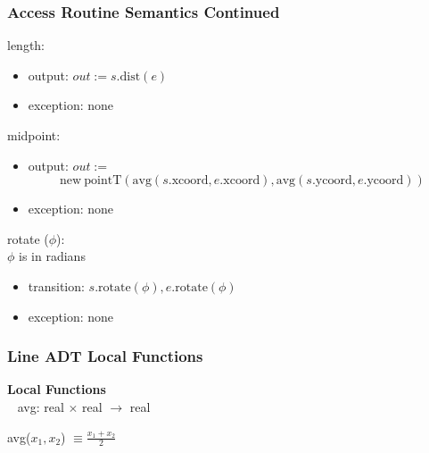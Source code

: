 \documentclass[t,12pt,numbers,fleqn,handout]{beamer}
\begin{document}

\begin{frame}
\frametitle{Access Routine Semantics Continued}

\noindent length:
\begin{itemize}
\item output: $out := s.\mathrm{dist}(e)$
\item exception: none
\end{itemize}

\noindent midpoint:
\begin{itemize}
\item output: $out := $
$$\mathrm{new~} \mathrm{pointT} (\mathrm{avg}(s.\mathrm{xcoord}, e.\mathrm{xcoord}), \mathrm{avg}(s.\mathrm{ycoord},
e.\mathrm{ycoord}))$$
\item exception: none
\end{itemize}

\noindent rotate ($\phi$):\\
$\phi$ is in radians
\begin{itemize}
\item transition: $s.\mathrm{rotate}(\phi), e.\mathrm{rotate}(\phi)$
\item exception: none
\end{itemize}

\end{frame}


\begin{frame}
\frametitle{Line ADT Local Functions}

\textbf{Local Functions}\\
~\newline
avg: real $\times$ real $\rightarrow$ real

\noindent avg($x_1, x_2$) $\equiv \frac{x_1 + x_2}{2}$

\end{frame}


\end{document}
